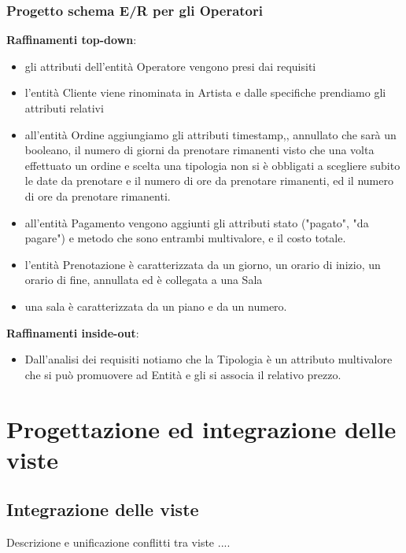 \documentclass{article}
\begin{document}
\subsubsection{Progetto schema E/R per gli Operatori}
\begin{center}
    
\end{center}
\textbf{Raffinamenti top-down}:
\begin{itemize}
    \item gli attributi dell'entità Operatore vengono presi dai requisiti
    \item l'entità Cliente viene rinominata in Artista e dalle specifiche prendiamo gli attributi relativi
    \item all'entità Ordine aggiungiamo gli attributi timestamp,, annullato che sarà un booleano, il numero di giorni da prenotare rimanenti visto che una volta effettuato un ordine e scelta una tipologia non si è obbligati a scegliere subito le date da prenotare e il numero di ore da prenotare rimanenti, ed il numero di ore da prenotare rimanenti.
    \item all'entità Pagamento vengono aggiunti gli attributi stato ("pagato", "da pagare") e metodo che sono entrambi multivalore, e il costo totale.
    \item l'entità Prenotazione è caratterizzata da un giorno, un orario di inizio, un orario di fine, annullata ed è collegata a una Sala
    \item una sala è caratterizzata da un piano e da un numero.
\end{itemize}
\textbf{Raffinamenti inside-out}:
\begin{itemize}
    \item Dall'analisi dei requisiti notiamo che la Tipologia è un attributo multivalore che si può promuovere ad Entità e gli si associa il relativo prezzo.
\end{itemize}
\begin{center}
    
\end{center}





\newpage
\section{Progettazione ed integrazione delle viste}


\subsection{Integrazione delle viste} 
Descrizione e unificazione conflitti tra viste ....
\end{document}
